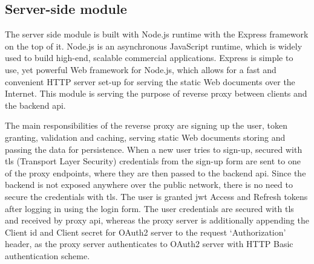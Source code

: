 
\subsection{Server-side module}\label{subsec:server-side-module}
The server side module is built with Node.js runtime with the Express framework on the top of it.
Node.js is an asynchronous JavaScript runtime, which is widely used to build high-end, scalable commercial applications.
Express is simple to use, yet powerful Web framework for Node.js, which allows for a fast and convenient HTTP server set-up for serving the static Web documents over the Internet.
This module is serving the purpose of reverse proxy between clients and the backend \gls{api}.

The main responsibilities of the reverse proxy are signing up the user, token granting, validation and caching, serving static Web documents storing and passing the data for persistence.
When a new user tries to sign-up, secured with \gls{tls} (Transport Layer Security) credentials from the sign-up form are sent to one of the proxy endpoints, where they are then passed to the backend \gls{api}.
Since the backend is not exposed anywhere over the public network, there is no need to secure the credentials with \gls{tls}.
The user is granted \gls{jwt} Access and Refresh tokens after logging in using the login form.
The user credentials are secured with \gls{tls} and received by proxy \gls{api}, whereas the proxy server is additionally appending the Client id and Client secret for OAuth2 server to the request `Authorization' header, as the proxy server authenticates to OAuth2 server with HTTP Basic authentication scheme.

